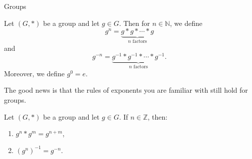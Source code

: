 \begin{section}{Groups}
\begin{definition}
Let \((G,*)\) be a group and let \(g\in G\).  Then for \(n\in \mathbb{N}\), we define
\[
g^n=\underbrace{g*g*\cdots *g}_{n\text{ factors}}
\]
and
\[
g^{-n}=\underbrace{g^{-1}*g^{-1}*\cdots *g^{-1}}_{n\text{ factors}}.
\]
Moreover, we define \(g^0=e\).
\end{definition}

The good news is that the rules of exponents you are familiar with still hold for groups.

\begin{theorem}
Let \((G,*)\) be a group and let \(g\in G\).  If \(n\in\mathbb{Z}\), then:
\begin{enumerate}
\item \(g^n*g^m=g^{n+m}\),
\item \((g^n)^{-1}=g^{-n}\).
\end{enumerate}
\end{theorem}

\end{section}

